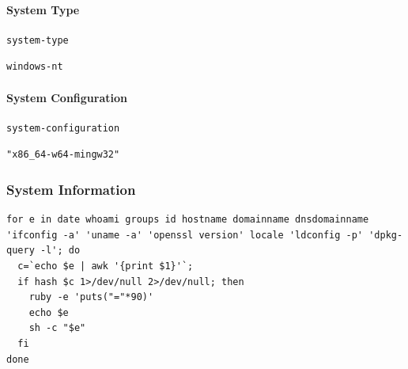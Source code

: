 \documentclass[11pt]{article}
\begin{document}
\paragraph{System Type}
\label{sec:orgc0583de}

\begin{verbatim}
system-type
\end{verbatim}

\begin{verbatim}
windows-nt
\end{verbatim}

\paragraph{System Configuration}
\label{sec:org4c341fa}

\begin{verbatim}
system-configuration
\end{verbatim}

\begin{verbatim}
"x86_64-w64-mingw32"
\end{verbatim}

\subsubsection{System Information}
\label{sec:org38a3a1f}

\begin{verbatim}
for e in date whoami groups id hostname domainname dnsdomainname 'ifconfig -a' 'uname -a' 'openssl version' locale 'ldconfig -p' 'dpkg-query -l'; do
  c=`echo $e | awk '{print $1}'`;
  if hash $c 1>/dev/null 2>/dev/null; then 
    ruby -e 'puts("="*90)'
    echo $e
    sh -c "$e"
  fi
done
\end{verbatim}
\end{document}
